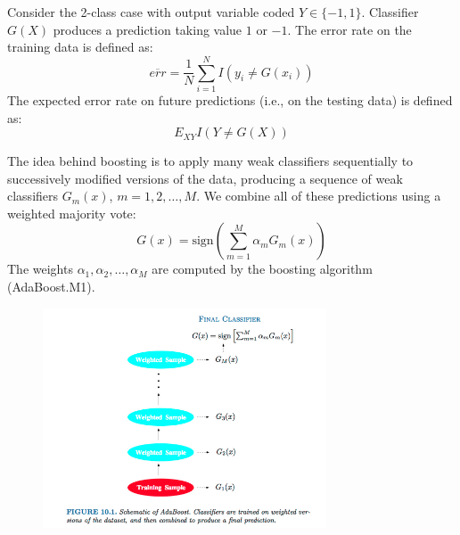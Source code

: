 \documentclass[a4paper]{article}
\begin{document}
Consider the 2-class case with output variable coded $Y\in \{-1,1\}$. Classifier $G(X)$ produces a prediction taking value $1$ or $-1$. The error rate on the training data is defined as:
$$\overline{err}=\frac{1}{N}\sum_{i=1}^N I(y_i\neq G(x_i))$$
The expected error rate on future predictions (i.e., on the testing data) is defined as:
$$E_{XY}I(Y\neq G(X))$$

The idea behind boosting is to apply many weak classifiers  sequentially to successively modified versions of the data, producing a sequence of weak classifiers $G_m(x)$, $m=1,2,\ldots,M$.  We combine all of these predictions using a weighted majority vote:
$$G(x)=\text{sign}\left(\sum_{m=1}^M \alpha_m G_m(x)\right)$$
The weights $\alpha_1,\alpha_2,\ldots,\alpha_M$ are computed by the boosting algorithm (AdaBoost.M1).
\newline

\begin{figure}
\centering
\includegraphics[width=0.75\textwidth]{Boosting.png}
\caption{\label{fig:boosting}}
\end{figure}
\end{document}
